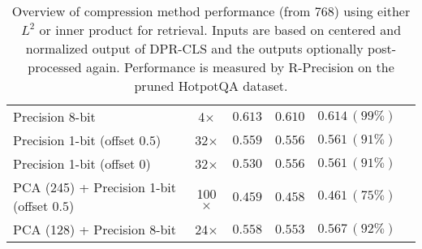 \begin{table*}[ht]
{\begin{tabular}{lccccc}
Precision 8-bit & 4$\times$ & $0.613$ & $0.610$ & $0.614\,{\scriptstyle (99\%)}$ \\
Precision 1-bit (offset $0.5$) & 32$\times$ & $0.559$ & $0.556$ & $0.561\,{\scriptstyle (91\%)}$ \\
Precision 1-bit (offset $0$) & 32$\times$ & $0.530$ & $0.556$ & $0.561\,{\scriptstyle (91\%)}$ \\
\cmidrule{1-5}
PCA (245) + Precision 1-bit (offset $0.5$)  & 100$\times$ & $0.459$ & $0.458$ & ${0.461}\,{\scriptstyle (75\%)}$ \\
PCA (128) + Precision 8-bit & 24$\times$ & $0.558$ & $0.553$ & ${0.567}\,{\scriptstyle (92\%)}$ \\
\bottomrule

\end{tabular}
}
\caption{Overview of compression method performance (from 768) using either $L^2$ or inner product for retrieval. Inputs are based on centered and normalized output of DPR-CLS and the outputs optionally post-processed again. Performance is measured by R-Precision on the pruned HotpotQA dataset.}
\label{tab:retrieval_summary}
\end{table*}